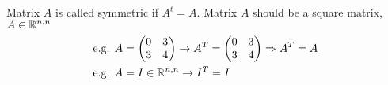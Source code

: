 \begin{definition}
Matrix $A$ is called symmetric if $A^t = A$. Matrix $A$ should be a square matrix, $A\in\mathbb{R}^{n,n}$
\begin{align*}
\text{e.g. }& A= \begin{pmatrix}
0 & 3 \\
3 & 4
\end{pmatrix} \to A^T = \begin{pmatrix}
0 & 3 \\
3 & 4
\end{pmatrix} \Rightarrow A^T = A\\
\text{e.g. }& A = I\in \mathbb{R}^{n,n} \to I^T = I
\end{align*}
\end{definition}







